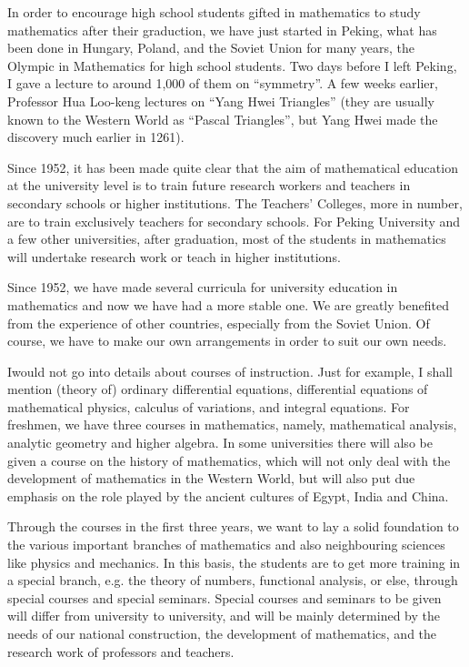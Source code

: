 In order to encourage high school students gifted in mathematics to study mathematics after their graduction, we have just started in Peking, what has been done in Hungary, Poland, and the Soviet Union for many years, the Olympic in Mathematics for high school students. Two days before I left Peking, I gave a lecture to around 1,000 of them on ``symmetry''. A few weeks earlier, Professor Hua Loo-keng lectures on ``Yang Hwei Triangles'' (they are usually known to the Western World as ``Pascal Triangles'', but Yang Hwei made the discovery much earlier in 1261).

Since 1952, it has been made quite clear that the aim of mathematical education at the university level is to train future research workers and teachers in secondary schools or higher institutions. The Teachers' Colleges, more in number, are to train exclusively teachers for secondary schools. For Peking University and a few other universities, after graduation, most of the students in mathematics will undertake research work or teach in higher institutions.

Since 1952, we have made several curricula for university education in mathematics and now we have had a more stable one. We are greatly benefited from the experience of other countries, especially from the Soviet Union. Of course, we have to make our own arrangements in order to suit our own needs.

I\pageoriginale would not go into details about courses of instruction. Just for example, I shall mention (theory of) ordinary differential equations, differential equations of mathematical physics, calculus of variations, and integral equations. For freshmen, we have three courses in mathematics, namely, mathematical analysis, analytic geometry and higher algebra. In some universities there will also be given a course on the history of mathematics, which will not only deal with the development of mathematics in the Western World, but will also put due emphasis on the role played by the ancient cultures of Egypt, India and China.

Through the courses in the first three years, we want to lay a solid foundation to the various important branches of mathematics and also neighbouring sciences like physics and mechanics. In this basis, the students are to get more training in a special branch, e.g. the theory of numbers, functional analysis, or else, through special courses and special seminars. Special courses and seminars to be given will differ from university to university, and will be mainly determined by the needs of our national construction, the development of mathematics, and the research work of professors and teachers.

